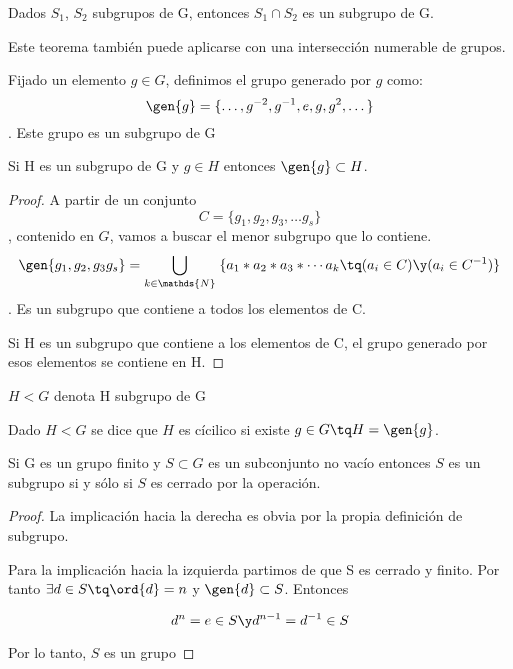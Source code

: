 \documentclass[a4paper,10pt]{apuntes}
\newenvironment{notacion}[1][Notación:]{\begin{trivlist}
\item[\hskip \labelsep {\bfseries #1}]}{\end{trivlist}}
\begin{document}
  \begin{theorem}
   Dados $S_{1}$, $S_{2}$ subgrupos de G, entonces $S_{1}\cap S_{2}$  es un subgrupo de G.
  \end{theorem}

  Este teorema también puede aplicarse con una intersección numerable de grupos.
  
  \begin{defn}
   Fijado un elemento $g \in G$, definimos el grupo generado por $g$ como:
   \[ \gen{g} =\{\dotsc, g^{-2}, g^{-1}, e, g, g^{2},\dotsc \}\]. Este grupo es un subgrupo de G
  \end{defn}

  \begin{theorem}
   Si H es un subgrupo de G y $g\in H$ entonces $\gen{g}\subset H$.   
  \end{theorem}
\begin{proof}
  A partir de un conjunto \[ C=\{g_{1}, g_{2}, g_{3}, \dotsc g_{s} \}\], contenido en $G$, vamos a buscar el menor subgrupo que lo contiene.
  \[ \gen{g_{1}, g_{2}, g_{3}g_{s}} =\bigcup_{k\in\mathds{N}}\; \{ a_{1} \ast a_{2}\ast a_{3} \ast \dotsb  a_{k} \tq (a_{i}\in C) \y (a_{i}\in C^{-1})\} \]. Es un subgrupo que contiene a  todos los elementos de C.
  
  Si H es un subgrupo que contiene a los elementos de C, el grupo generado por esos elementos se contiene en H.
  \end{proof}
  
  \begin{notacion}
   $H<G$ denota H subgrupo de G
  \end{notacion}
  
  \begin{defn}
   Dado $H<G$ se dice que $H$ es cícilico si existe $g\in G \tq H=\gen{g}$.
  \end{defn}

  \begin{theorem}
   Si G es un grupo finito y $S\subset G$ es un subconjunto no vacío entonces $S$ es un subgrupo si y sólo si $S$ es cerrado por la operación.   
  \end{theorem}
  
  \begin{proof}
   La implicación hacia la derecha es obvia por la propia definición de subgrupo.
   
   Para la implicación hacia la izquierda partimos de que S es cerrado y finito. Por tanto $\exists d \in S \tq \ord{d}=n$ y $\gen{d} \subset S$. Entonces
   
\[ d^{n}=e\in S \y d^{n-1}=d^{-1}\in S\]

Por lo tanto, $S$ es un grupo
  \end{proof}
\end{document}
